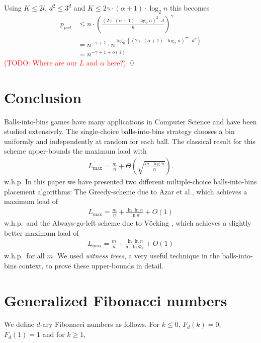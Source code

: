 \documentclass[a4paper,12pt]{article}
\newcommand\todo[1]{\textcolor{red}{(TODO: #1)}}
\newcommand\load{L_{\mathrm{max}}}
\begin{document}
Using $K \leq 2l$, $d^2 \leq 3^d$ and $K \leq 2\gamma \cdot \left( \alpha +1 \right) \cdot \log_2 n$ this becomes
\begin{align*}
p_{pwt} &\leq n\cdot \left(\frac{\left(2\gamma \cdot \left(\alpha +1 \right) \cdot \log_2 n\right)^2\cdot d}{n}\right)^\gamma \\
        &= n^{-\gamma +1} \cdot n ^{\log_n\left( \left(2\gamma\cdot \left(\alpha+1\right)\cdot \log_2n \right)^{2\gamma} \cdot d^\gamma \right)}\\
        &= n^{-\gamma+1+o\left(1\right)}
\end{align*}
\todo{Where are our $L$ and $\alpha$ here?}
\qed
 
\section{Conclusion}
\label{sec:conclusion}
Balls-into-bins games have many applications in Computer Science and have been studied extensively. The single-choice balls-into-bins strategy chooses a bin uniformly and independently at random for each ball. The classical result for this scheme upper-bounds the maximum load with 
\begin{align*}
\load = \frac{m}{n} + \Theta\left(\sqrt{\frac{m \cdot \log n}{n}}\right).
\end{align*}
w.h.p.
In this paper we have presented two different miltiple-choice balls-into-bins placement algorithms: The Greedy-scheme due to Azar et al.\cite{ABKU99}, which achieves a maximum load of 
\begin{align*}
\load = \frac{m}{n} + \frac{\ln\ln n}{\ln d} + O(1)
\end{align*}
w.h.p.~and the Always-go-left scheme due to V\"ocking \cite{VOC03}, which achieves a slightly better maximum load of
\begin{align*}
\load = \frac{m}{n} + \frac{\ln \ln n}{d\cdot \ln \Phi_d} + O(1)
\end{align*}
w.h.p.~for all $m$. We used \emph{witness trees}, a very useful technique in the balls-into-bins context, to prove these upper-bounds in detail.


\appendix
\section{Generalized Fibonacci numbers}
\label{sec:fibonacci}
We define $d$-ary Fibonacci numbers as follows. For $k \leq0$, $F_d(k) = 0$, $F_d(1) = 1$ and for $k \geq 1$,
\end{document}
